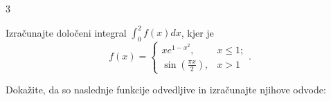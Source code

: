 \documentclass[11pt,a4paper]{exam}
\renewcommand{\leq}{\leqslant} %
\renewcommand{\{}{\lbrace}
\renewcommand{\}}{\rbrace}
\begin{document}
\begin{questions}
\begin{multicols}{3}
				\end{multicols}
	
			
				\question Izračunajte določeni integral $\int_{0}^{2}f(x) dx$, kjer je 
				\[f(x) = \begin{cases}
					x e^{1-x^{2}}, & x \leq 1; \\
					\sin\left( \frac{\pi x}{2} \right), & x > 1
				\end{cases}.\]
	
			\question Dokažite, da so naslednje funkcije odvedljive in izračunajte njihove odvode: 
\end{questions}
\end{document}
